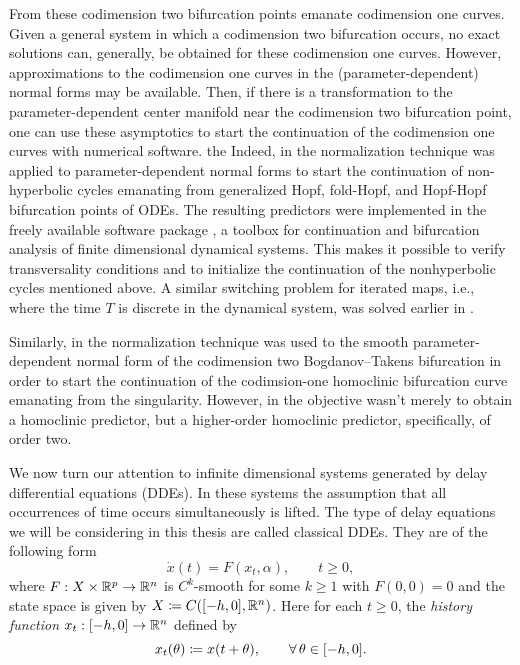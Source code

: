 From these codimension two bifurcation points emanate codimension one curves.
Given a general system in which a codimension two bifurcation occurs, no exact
solutions can, generally, be obtained for these codimension one curves.
However, approximations to the codimension one curves in the
(parameter-dependent) normal forms may be available. Then, if there is a
transformation to the parameter-dependent center manifold near the
codimension two bifurcation point, one can use these asymptotics to start
the continuation of the codimension one curves with numerical software.
the 
Indeed, in \cite{Kuznetsov2008} the normalization technique was applied to
parameter-dependent normal forms to start the continuation of non-hyperbolic
cycles emanating from generalized Hopf, fold-Hopf, and Hopf-Hopf bifurcation
points of ODEs. The resulting predictors were implemented in the freely
available software package \MATCONT \cite{matcont1}, a \MATLAB toolbox for
continuation and bifurcation analysis of finite dimensional dynamical systems.
This makes it possible to verify transversality conditions and to initialize
the continuation of the nonhyperbolic cycles mentioned above. A similar
switching problem for iterated maps, i.e., where the time $T$ is discrete in
the dynamical system, was solved earlier in \cite{Govaerts2007maps}.

Similarly, in \cite{Kuznetsov2014improved} the normalization technique was used
to the smooth parameter-dependent normal form of the codimension two
Bogdanov--Takens bifurcation in order to start the continuation of the
codimsion-one homoclinic bifurcation curve emanating from the singularity.
However, in \cite{Kuznetsov2014improved} the objective wasn't merely to obtain
a homoclinic predictor, but a higher-order homoclinic predictor, specifically,
of order two. 

We now turn our attention to infinite dimensional systems generated by delay
differential equations (DDEs). In these systems the assumption that all
occurrences of time occurs simultaneously is lifted. The type of delay equations
we will be considering in this thesis are called classical DDEs. They are of the
following form
\begin{equation}
    \dot{x}(t)= F(x_t, \alpha), \qquad t \ge 0,
\end{equation}
where $F: X \times \mathbb{R}^p \to \mathbb{R}^n$ is $C^k$-smooth for some $k \ge 1$ with
$F(0,0) = 0$ and the state space is given by $X \coloneqq C([-h,0],\mathbb{R}^n)$. Here for
each $t \ge 0$, the \emph{history function} $x_t : [-h,0] \to \mathbb{R}^n$ defined by
\[
  x_t(\theta) \coloneqq x(t + \theta), \qquad \forall\,\theta \in [-h,0].
\]

